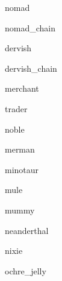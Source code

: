 \documentclass[a4paper,serif]{module}
\begin{document}
\begin{newmonster}{nomad}\end{newmonster}

\begin{newmonster}{nomad_chain}\end{newmonster}

\begin{newmonster}{dervish}\end{newmonster}

\begin{newmonster}{dervish_chain}\end{newmonster}

\begin{newmonster}{merchant}\end{newmonster}

\begin{newmonster}{trader}\end{newmonster}

\begin{newmonster}{noble}\end{newmonster}

\begin{newmonster}{merman}\end{newmonster}

\begin{newmonster}{minotaur}\end{newmonster}

\begin{newmonster}{mule}\end{newmonster}

\begin{newmonster}{mummy}\end{newmonster}

\begin{newmonster}{neanderthal}\end{newmonster}

\begin{newmonster}{nixie}\end{newmonster}

\begin{newmonster}{ochre_jelly}\end{newmonster}
\end{document}

